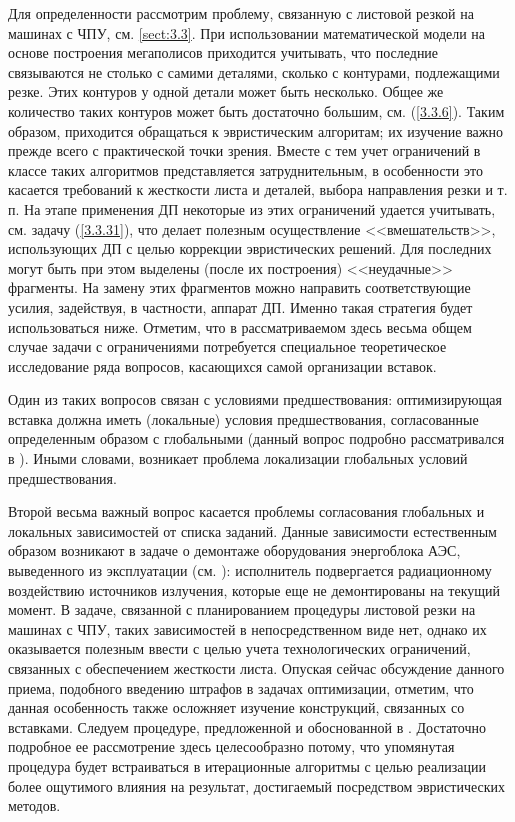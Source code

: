 Для определенности рассмотрим проблему, связанную с
листовой резкой на машинах с ЧПУ,
см. \ref{sect:3.3}.
При использовании
математической модели на основе построения мегаполисов приходится учитывать,
что последние связываются не столько с самими деталями, сколько с контурами,
подлежащими резке.
Этих контуров у одной детали может быть несколько.
Общее же количество таких контуров может быть достаточно большим,
см. (\ref{3.3.6}).
Таким образом, приходится обращаться к эвристическим алгоритам;
их изучение важно прежде всего с практической точки зрения.
Вместе с тем учет ограничений в классе таких алгоритмов представляется
затруднительным,
в особенности это касается требований к жесткости листа
и деталей, выбора направления резки и т. п.
На этапе применения ДП некоторые
из этих ограничений удается учитывать,
см. задачу (\ref{3.3.31}),
что делает полезным осуществление <<вмешательств>>,
использующих ДП
с целью коррекции эвристических решений.
Для последних могут быть при этом выделены
(после их построения)
<<неудачные>> фрагменты.
На замену этих
фрагментов можно направить соответствующие  усилия,
задействуя, в частности, аппарат ДП.
Именно такая стратегия будет использоваться ниже.
Отметим,
что в рассматриваемом здесь весьма общем случае задачи с ограничениями
потребуется специальное теоретическое исследование ряда вопросов,
касающихся самой организации вставок.

Один из таких вопросов  связан с условиями предшествования:
оптимизирующая вставка должна иметь
(локальные)
условия предшествования, согласованные определенным образом с глобальными
(данный вопрос подробно рассматривался в \cite{Cha14`}).
Иными словами, возникает проблема локализации глобальных
условий предшествования.

Второй весьма важный вопрос касается проблемы согласования глобальных и
локальных зависимостей от списка заданий.
Данные зависимости естественным
образом возникают в задаче о демонтаже оборудования энергоблока АЭС,
выведенного из эксплуатации (см. \cite{Cha2`}):
исполнитель подвергается
радиационному воздействию источников излучения,
которые еще не демонтированы на текущий момент.
В задаче, связанной с планированием процедуры листовой
резки на машинах с ЧПУ, таких зависимостей в непосредственном виде нет,
однако их оказывается полезным ввести с целью учета технологических
ограничений, связанных с обеспечением жесткости листа.
Опуская сейчас
обсуждение данного приема, подобного введению штрафов в задачах оптимизации,
отметим, что данная особенность также осложняет изучение конструкций,
связанных со вставками.
Следуем процедуре, предложенной и обоснованной
в \cite{Cha13`}.
Достаточно подробное ее рассмотрение здесь целесообразно
потому, что упомянутая процедура будет встраиваться в итерационные
алгоритмы с целью реализации более ощутимого влияния на результат,
достигаемый посредством эвристических методов.
